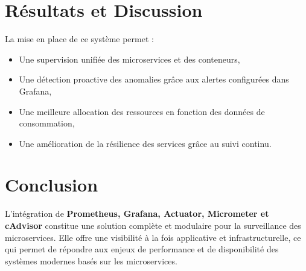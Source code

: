 \section{Résultats et Discussion}
La mise en place de ce système permet :
\begin{itemize}
    \item Une supervision unifiée des microservices et des conteneurs,
    \item Une détection proactive des anomalies grâce aux alertes configurées dans Grafana,
    \item  Une meilleure allocation des ressources en fonction des données de consommation,
    \item Une amélioration de la résilience des services grâce au suivi continu.
\end{itemize}

\section{Conclusion}
L’intégration de \textbf{Prometheus, Grafana, Actuator, Micrometer et cAdvisor} constitue une solution complète et modulaire pour la surveillance des microservices. Elle offre une visibilité à la fois applicative et infrastructurelle, ce qui permet de répondre aux enjeux de performance et de disponibilité des systèmes modernes basés sur les microservices.

